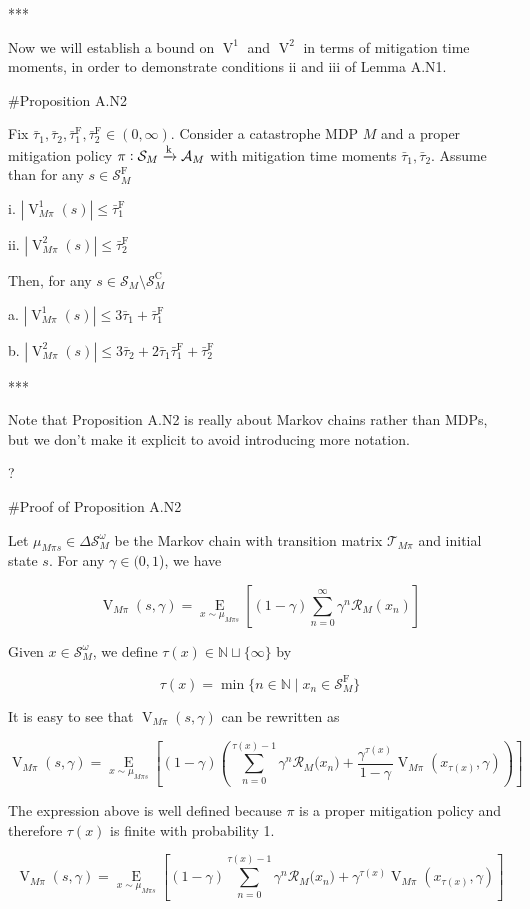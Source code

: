 \documentclass[a4paper]{article}
\newcommand{\AP}[1]{\left(#1\right)}
\newcommand{\AB}[1]{\left[#1\right]}
\newcommand{\Ea}[2]{\underset{#1}{\operatorname{E}}\AB{#2}}
\newcommand{\Nats}{\mathbb{N}}
\newcommand{\Abs}[1]{\left\vert #1 \right\vert}
\newcommand{\M}{\xrightarrow{\textnormal{k}}}
\newcommand{\A}{\mathcal{A}}
\newcommand{\St}{\mathcal{S}}
\newcommand{\T}{\mathcal{T}}
\newcommand{\R}{\mathcal{R}}
\newcommand{\RMC}{\mathrm{C}}
\newcommand{\RMF}{\mathrm{F}}
\newcommand{\SF}{\St^{\RMF}}
\newcommand{\SC}{\St^{\RMC}}
\newcommand{\TF}{\bar{\tau}^{\RMF}}
\newcommand{\V}{\operatorname{V}}
\begin{document}
***

Now we will establish a bound on $\V^1$ and $\V^2$ in terms of mitigation time moments, in order to demonstrate conditions ii and iii of Lemma A.N1.

\#Proposition A.N2

Fix $\bar{\tau}_1, \bar{\tau}_2, \TF_1, \TF_2 \in (0,\infty)$. Consider a catastrophe MDP $M$ and a proper mitigation policy $\pi: \St_M \M \A_M$ with mitigation time moments $\bar{\tau}_1, \bar{\tau}_2$. Assume than for any $s \in \SF_M$

i. $\Abs{\V^1_{M\pi}(s)} \leq \TF_1$

ii. $\Abs{\V^2_{M\pi}(s)} \leq \TF_2$

Then, for any $s \in \St_M \setminus \SC_M$

a. $\Abs{\V^1_{M\pi}(s)} \leq 3 \bar{\tau}_1 + \TF_1$

b. $\Abs{\V^2_{M\pi}(s)} \leq 3 \bar{\tau}_2 + 2 \bar{\tau}_1 \TF_1 + \TF_2$

***

Note that Proposition A.N2 is really about Markov chains rather than MDPs, but we don't make it explicit to avoid introducing more notation.

? %

\#Proof of Proposition A.N2

Let $\mu_{M\pi s}\in\Delta\St_M^\omega$ be the Markov chain with transition matrix $\T_{M\pi}$ and initial state $s$. For any $\gamma\in(0,1$), we have

$$\V_{M\pi}(s,\gamma) = \Ea{x\sim\mu_{M\pi s}}{(1-\gamma)\sum_{n=0}^\infty \gamma^n \R_M\AP{x_n}}$$

Given $x\in\St_M^\omega$, we define $\tau(x) \in \Nats \sqcup \{\infty\}$ by 

$$\tau(x)=\min\{n \in \Nats \mid x_n \in \SF_M\}$$

It is easy to see that $\V_{M\pi}(s,\gamma)$ can be rewritten as

$$\V_{M\pi}(s,\gamma) = \Ea{x\sim\mu_{M\pi s}}{(1-\gamma)\AP{\sum_{n=0}^{\tau(x)-1} \gamma^n \R_M\Big(x_n\Big) + \frac{\gamma^{\tau(x)}}{1-\gamma}\V_{M\pi}\AP{x_{\tau(x)},\gamma}}}$$

The expression above is well defined because $\pi$ is a proper mitigation policy and therefore $\tau(x)$ is finite with probability 1.

$$\V_{M\pi}(s,\gamma) = \Ea{x\sim\mu_{M\pi s}}{(1-\gamma)\sum_{n=0}^{\tau(x)-1} \gamma^n \R_M\Big(x_n\Big) + \gamma^{\tau(x)}\V_{M\pi}\AP{x_{\tau(x)},\gamma}}$$
\end{document}
